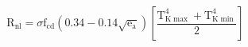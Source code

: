 \documentclass[12pt]{article}
\begin{document}
\begin{displaymath}
\mathrm{R}_{\mathrm{nl}}=\sigma \mathrm{f}_{\mathrm{cd}}\left(0.34-0.14 \sqrt{\mathrm{e}_{\mathrm{a}}}\right)\left[\frac{\mathrm{T}_{\mathrm{K} \max }^{4}+\mathrm{T}_{\mathrm{K} \min }^{4}}{2}\right]
\end{displaymath}
\end{document}
